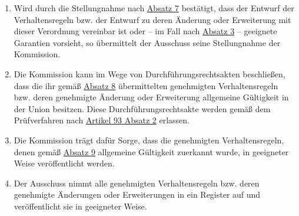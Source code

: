 \begin{enumerate}
  \item Wird durch die Stellungnahme nach \hyperref[itm:40-3]{Absatz 7} bestätigt, dass der Entwurf der Verhaltensregeln
   bzw. der Entwurf zu deren Änderung oder Erweiterung mit dieser Verordnung vereinbar ist oder -- im Fall
   nach \hyperref[itm:40-3]{Absatz 3} -- geeignete Garantien vorsieht, so übermittelt der Ausschuss seine Stellungnahme
   der Kommission.
  \label{itm:40-8}

  \item Die Kommission kann im Wege von Durchführungsrechtsakten beschließen, dass die ihr gemäß \hyperref[itm:40-8]
   {Absatz 8} übermittelten genehmigten Verhaltensregeln bzw. deren genehmigte Änderung oder Erweiterung allgemeine
   Gültigkeit in der Union besitzen. Diese Durchführungsrechtsakte werden gemäß dem Prüfverfahren nach \hyperref
   [itm:93-2]{Artikel 93 Absatz 2} erlassen.
  \label{itm:40-9}

  \item Die Kommission trägt dafür Sorge, dass die genehmigten Verhaltensregeln, denen gemäß \hyperref[itm:40-9]
   {Absatz 9} allgemeine Gültigkeit zuerkannt wurde, in geeigneter Weise veröffentlicht werden.
  \label{itm:40-10}

  \item Der Ausschuss nimmt alle genehmigten Verhaltensregeln bzw. deren genehmigte Änderungen oder Erweiterungen in ein
   Register auf und veröffentlicht sie in geeigneter Weise.
  \label{itm:40-11}

\end{enumerate}


